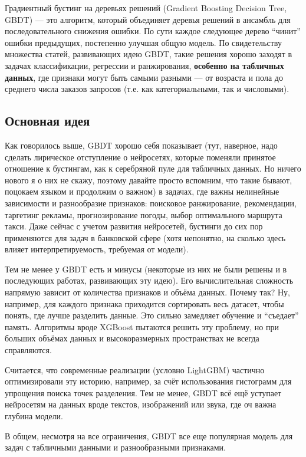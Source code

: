 Градиентный бустинг на деревьях решений (Gradient Boosting Decision Tree, GBDT) — это алгоритм, который объединяет деревья решений в ансамбль для последовательного снижения ошибки. По сути каждое следующее дерево ``чинит''  ошибки предыдущих, постепенно улучшая общую модель. По свидетельству множества статей, развивающих идею GBDT, такие решения хорошо заходят в задачах классификации, регрессии и ранжирования, \textbf{особенно на табличных данных}, где признаки могут быть самыми разными — от возраста и пола до среднего числа заказов запросов (т.е. как категориальными, так и числовыми).

\subsection*{Основная идея}

Как говорилось выше, GBDT хорошо себя показывает (тут, наверное, надо сделать лирическое отступление о нейросетях, которые поменяли принятое отношение к бустингам, как к серебряной пуле для табличных данных. Но ничего нового я о них не скажу, поэтому давайте просто вспомним, что такие бывают, поцокаем языком и продолжим о важном) в задачах, где важны нелинейные зависимости и разнообразие признаков: поисковое ранжирование, рекомендации, таргетинг рекламы, прогнозирование погоды, выбор оптимального маршрута такси. Даже сейчас с учетом развития нейросетей, бустинги до сих пор применяются для задач в банковской сфере (хотя непонятно, на сколько здесь влияет интерпретируемость, требуемая от модели).

Тем не менее у GBDT есть и минусы (некоторые из них не были решены и в последующих работах, развивающих эту идею). Его вычислительная сложность напрямую зависит от количества признаков и объёма данных. Почему так? Ну, например, для каждого признака приходится сортировать весь датасет, чтобы понять, где лучше разделить данные. Это сильно замедляет обучение и ``съедает'' память. Алгоритмы вроде XGBoost пытаются решить эту проблему, но при больших объёмах данных и высокоразмерных пространствах не всегда справляются.

Считается, что современные реализации (условно LightGBM) частично оптимизировали эту историю, например, за счёт использования гистограмм для упрощения поиска точек разделения. Тем не менее, GBDT всё ещё уступает нейросетям на данных вроде текстов, изображений или звука, где оч важна глубина модели.

В общем, несмотря на все ограничения, GBDT все еще популярная модель для задач с табличными данными и разнообразными признаками.

